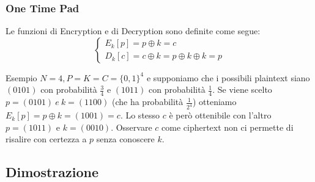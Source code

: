 	\begin{frame}
		\frametitle{One Time Pad}
		Le funzioni di Encryption e di Decryption sono definite come segue:
		$$\begin{cases}
			E_k[p] = p \oplus k = c\\
			D_k[c] = c \oplus k = p \oplus k \oplus k = p
		\end{cases}$$
		{
			\fontsize{10}{0}
			\begin{block}{Esempio}
				$N = 4, P=K=C=\{0,1\}^4$ e supponiamo che i possibili plaintext siano $(0101)$ con probabilità $\frac{3}{4}$ e $(1011)$ con probabilità $\frac{1}{4}$. Se viene scelto $p = (0101) \ e\ k = (1100)$ (che ha probabilità $\frac{1}{2^4}$) otteniamo  $E_k[p] = p \oplus k = (1001) = c$. Lo stesso $c$ è però ottenibile con l'altro $p = (1011)$ e $k = (0010)$. Osservare $c$ come ciphertext non ci permette di risalire con certezza a $p$ senza conoscere $k$.
			\end{block}
		}
	\end{frame}

	\subsection{Dimostrazione}

